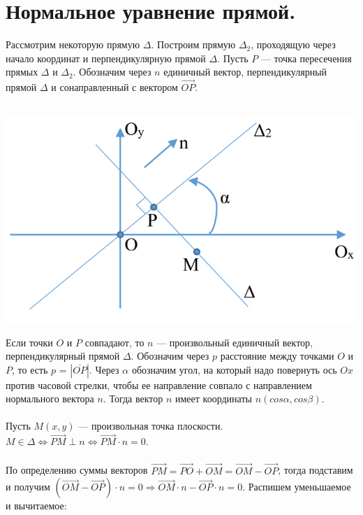 \section{Нормальное уравнение прямой.}
Рассмотрим некоторую прямую $\Delta$. Построим прямую $\Delta_2$, проходящую через начало координат и перпендикулярную прямой $\Delta$. Пусть $P$ --- точка пересечения прямых $\Delta$ и $\Delta_2$. Обозначим через $n$ единичный вектор, перпендикулярный прямой $\Delta$ и сонаправленный с вектором $\overrightarrow{OP}$. \\\\
\begin{center}
	\includegraphics[scale=0.4]{images/pic3_2.png}
\end{center}
Если точки $O$ и $P$ совпадают, то $n$ --- произвольный единичный вектор, перпендикулярный прямой $\Delta$. Обозначим через $p$ расстояние между точками $O$ и $P$, то есть $p$ = $|\overline{OP}|$. Через $\alpha$ обозначим угол, на который надо повернуть ось $Ox$ против часовой стрелки, чтобы ее направление совпало с направлением нормального вектора $n$. Тогда вектор $n$ имеет координаты $n(cos \alpha, cos \beta)$. \\\\
Пусть $M(x, y)$ --- произвольная точка плоскости. $M\in\Delta\Longleftrightarrow\overrightarrow{PM}\perp n\Longleftrightarrow\overrightarrow{PM}\cdot n = 0.$ \\\\
По определению суммы векторов $\overrightarrow{PM} = \overrightarrow{PO} + \overrightarrow{OM} = \overrightarrow{OM} - \overrightarrow{OP}$, тогда подставим и получим $(\overrightarrow{OM} - \overrightarrow{OP})\cdot n = 0 \Rightarrow \overrightarrow{OM} \cdot n - \overrightarrow{OP} \cdot n = 0.$ Распишем уменьшаемое и вычитаемое: \\
